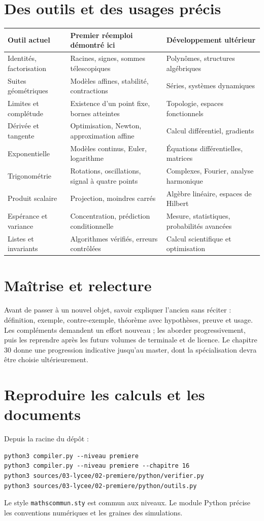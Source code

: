 \documentclass[11pt,a4paper,oneside]{book}
\begin{document}
\section{Des outils et des usages précis}
\begin{longtable}{>{\raggedright\arraybackslash}p{.25\linewidth}>{\raggedright\arraybackslash}p{.35\linewidth}>{\raggedright\arraybackslash}p{.30\linewidth}}
\toprule Outil actuel & Premier réemploi démontré ici & Développement ultérieur\\\midrule
Identités, factorisation & Racines, signes, sommes télescopiques & Polynômes, structures algébriques\\
Suites géométriques & Modèles affines, stabilité, contractions & Séries, systèmes dynamiques\\
Limites et complétude & Existence d'un point fixe, bornes atteintes & Topologie, espaces fonctionnels\\
Dérivée et tangente & Optimisation, Newton, approximation affine & Calcul différentiel, gradients\\
Exponentielle & Modèles continus, Euler, logarithme & Équations différentielles, matrices\\
Trigonométrie & Rotations, oscillations, signal à quatre points & Complexes, Fourier, analyse harmonique\\
Produit scalaire & Projection, moindres carrés & Algèbre linéaire, espaces de Hilbert\\
Espérance et variance & Concentration, prédiction conditionnelle & Mesure, statistiques, probabilités avancées\\
Listes et invariants & Algorithmes vérifiés, erreurs contrôlées & Calcul scientifique et optimisation\\\bottomrule
\end{longtable}

\section{Maîtrise et relecture}
Avant de passer à un nouvel objet, savoir expliquer l'ancien sans réciter :
définition, exemple, contre-exemple, théorème avec hypothèses, preuve et usage.
Les compléments demandent un effort nouveau ; les aborder progressivement,
puis les reprendre après les futurs volumes de terminale et de licence.
Le chapitre 30 donne une progression indicative jusqu'au master, dont la
spécialisation devra être choisie ultérieurement.

\section{Reproduire les calculs et les documents}
Depuis la racine du dépôt :
\begin{lstlisting}
python3 compiler.py --niveau premiere
python3 compiler.py --niveau premiere --chapitre 16
python3 sources/03-lycee/02-premiere/python/verifier.py
python3 sources/03-lycee/02-premiere/python/outils.py
\end{lstlisting}
Le style \texttt{mathscommun.sty} est commun aux niveaux. Le module Python précise
les conventions numériques et les graines des simulations.
\end{document}
